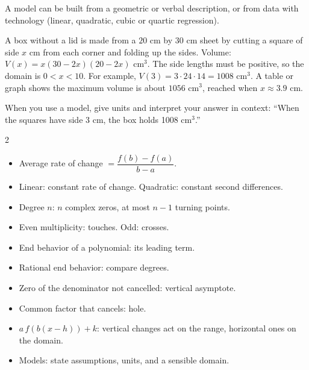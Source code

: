 \documentclass[11pt]{article}
\begin{document}
A model can be built from a geometric or verbal description, or from data with technology (linear, quadratic, cubic or quartic regression).

\begin{example}
A box without a lid is made from a $20$ cm by $30$ cm sheet by cutting a square of side $x$ cm from each corner and folding up the sides.
\sol Volume: $V(x)=x(30-2x)(20-2x)$ cm$^3$. The side lengths must be positive, so the domain is $0<x<10$.
For example, $V(3)=3\cdot24\cdot14=1008$ cm$^3$. A table or graph shows the maximum volume is about $1056$ cm$^3$, reached when $x\approx3.9$ cm.
\end{example}

\begin{aptip}
When you use a model, give units and interpret your answer in context: ``When the squares have side 3 cm, the box holds 1008 cm$^3$.''
\end{aptip}

\begin{multicols}{2}\small
\begin{itemize}
\item Average rate of change $=\dfrac{f(b)-f(a)}{b-a}$.
\item Linear: constant rate of change. Quadratic: constant second differences.
\item Degree $n$: $n$ complex zeros, at most $n-1$ turning points.
\item Even multiplicity: touches. Odd: crosses.
\item End behavior of a polynomial: its leading term.
\item Rational end behavior: compare degrees.
\item Zero of the denominator not cancelled: vertical asymptote.
\item Common factor that cancels: hole.
\item $a\,f(b(x-h))+k$: vertical changes act on the range, horizontal ones on the domain.
\item Models: state assumptions, units, and a sensible domain.
\end{itemize}
\end{multicols}
\end{document}
